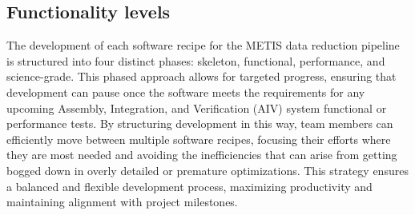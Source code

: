 \documentclass[a4paper]{spie}  %
\begin{document}
\subsection{Functionality levels}
\label{subsec:imp_levels}

The development of each software recipe for the METIS data reduction pipeline is structured into four distinct phases: skeleton, functional, performance, and science-grade. This phased approach allows for targeted progress, ensuring that development can pause once the software meets the requirements for any upcoming Assembly, Integration, and Verification (AIV) system functional or performance tests. By structuring development in this way, team members can efficiently move between multiple software recipes, focusing their efforts where they are most needed and avoiding the inefficiencies that can arise from getting bogged down in overly detailed or premature optimizations. This strategy ensures a balanced and flexible development process, maximizing productivity and maintaining alignment with project milestones. 
  
\end{document}
